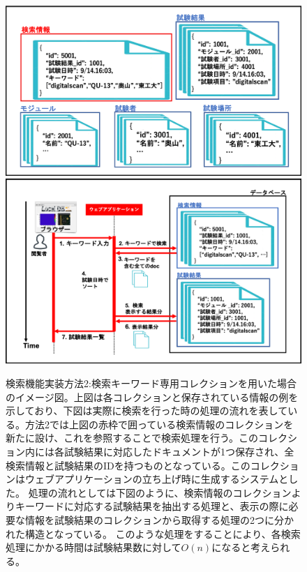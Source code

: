 \begin{figure}[bpt]
  \begin{center}
    \includegraphics[width=12cm]{search_mongo_collection}
    \includegraphics[width=12cm]{search_mongo_collection_flow}
  \caption[検索機能実装方法2:検索キーワード専用コレクションを用いた場合]{検索機能実装方法2:検索キーワード専用コレクションを用いた場合のイメージ図。上図は各コレクションと保存されている情報の例を示しており、下図は実際に検索を行った時の処理の流れを表している。方法2では上図の赤枠で囲っている検索情報のコレクションを新たに設け、これを参照することで検索処理を行う。このコレクション内には各試験結果に対応したドキュメントが1つ保存され、全検索情報と試験結果のIDを持つものとなっている。このコレクションはウェブアプリケーションの立ち上げ時に生成するシステムとした。
処理の流れとしては下図のように、検索情報のコレクションよりキーワードに対応する試験結果を抽出する処理と、表示の際に必要な情報を試験結果のコレクションから取得する処理の2つに分かれた構造となっている。
このような処理をすることにより、各検索処理にかかる時間は試験結果数に対して$O(n)$になると考えられる。}
  \label{search_mongo_collection}
  \end{center}
\end{figure}

